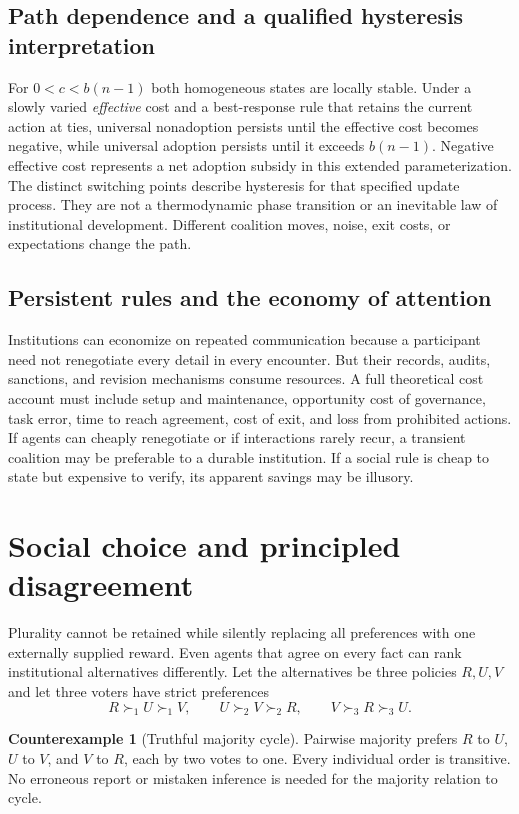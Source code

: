 \documentclass[11pt,letterpaper]{article}
\theoremstyle{plain}
\theoremstyle{definition}
\newtheorem{counterexample}[proposition]{Counterexample}
\theoremstyle{remark}
\begin{document}
\subsection{Path dependence and a qualified hysteresis interpretation}
For $0<c<b(n-1)$ both homogeneous states are locally stable. Under a slowly varied \emph{effective} cost and a best-response rule that retains the current action at ties, universal nonadoption persists until the effective cost becomes negative, while universal adoption persists until it exceeds $b(n-1)$. Negative effective cost represents a net adoption subsidy in this extended parameterization. The distinct switching points describe hysteresis for that specified update process. They are not a thermodynamic phase transition or an inevitable law of institutional development. Different coalition moves, noise, exit costs, or expectations change the path.

\subsection{Persistent rules and the economy of attention}

Institutions can economize on repeated communication because a participant need not renegotiate every detail in every encounter. But their records, audits, sanctions, and revision mechanisms consume resources. A full theoretical cost account must include setup and maintenance, opportunity cost of governance, task error, time to reach agreement, cost of exit, and loss from prohibited actions. If agents can cheaply renegotiate or if interactions rarely recur, a transient coalition may be preferable to a durable institution. If a social rule is cheap to state but expensive to verify, its apparent savings may be illusory.


\section{Social choice and principled disagreement}\label{sec:choice}
Plurality cannot be retained while silently replacing all preferences with one externally supplied reward. Even agents that agree on every fact can rank institutional alternatives differently. Let the alternatives be three policies $R,U,V$ and let three voters have strict preferences
\[
R\succ_1 U\succ_1 V,\qquad
U\succ_2 V\succ_2 R,\qquad
V\succ_3 R\succ_3 U.
\]

\begin{counterexample}[Truthful majority cycle]\label{ex:majority}
Pairwise majority prefers $R$ to $U$, $U$ to $V$, and $V$ to $R$, each by two votes to one. Every individual order is transitive. No erroneous report or mistaken inference is needed for the majority relation to cycle.
\end{counterexample}
\end{document}

